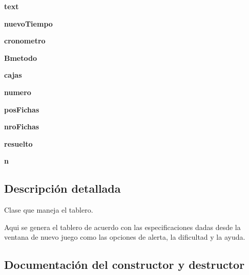 \begin{DoxyCompactItemize}
\item 
{\bfseries text}\label{classsudoku_1_1_sudoku_a3ef9b3cb73521c03fc13a55195371df6}

\item 
{\bfseries nuevo\-Tiempo}\label{classsudoku_1_1_sudoku_ab54f34d9121b3d949b15e26053121a60}

\item 
{\bfseries cronometro}\label{classsudoku_1_1_sudoku_aecc1384833d05b2f20df9ed4b085965c}

\item 
{\bfseries Bmetodo}\label{classsudoku_1_1_sudoku_abd8e43ea44fb20adb86165a0b36a1dcc}

\item 
{\bfseries cajas}\label{classsudoku_1_1_sudoku_ae70a9aa78c648f9bb01457db5e9ad14e}

\item 
{\bfseries numero}\label{classsudoku_1_1_sudoku_ad01be06931dc273aa73327c23923ddac}

\item 
{\bfseries pos\-Fichas}\label{classsudoku_1_1_sudoku_ae29c470920cd2318f8103d209e278a9f}

\item 
{\bfseries nro\-Fichas}\label{classsudoku_1_1_sudoku_ace939fd0f2355c195b77d66a256cd6e7}

\item 
{\bfseries resuelto}\label{classsudoku_1_1_sudoku_a8eb9dd56067013c106d40d66d16dbc54}

\item 
{\bfseries n}\label{classsudoku_1_1_sudoku_a622ecbe2563df85e66af316d2c075388}

\end{DoxyCompactItemize}


\subsection{Descripción detallada}
Clase que maneja el tablero. 

Aqui se genera el tablero de acuerdo con las especificaciones dadas desde la ventana de nuevo juego como las opciones de alerta, la dificultad y la ayuda. 

\subsection{Documentación del constructor y destructor}
